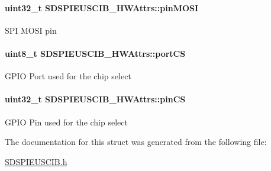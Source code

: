 \paragraph[{pin\+M\+O\+S\+I}]{\setlength{\rightskip}{0pt plus 5cm}uint32\+\_\+t S\+D\+S\+P\+I\+E\+U\+S\+C\+I\+B\+\_\+\+H\+W\+Attrs\+::pin\+M\+O\+S\+I}\label{struct_s_d_s_p_i_e_u_s_c_i_b___h_w_attrs_a76e4ea3cba4e266ff0699f85d7bd042a}
S\+P\+I M\+O\+S\+I pin 
\paragraph[{port\+C\+S}]{\setlength{\rightskip}{0pt plus 5cm}uint8\+\_\+t S\+D\+S\+P\+I\+E\+U\+S\+C\+I\+B\+\_\+\+H\+W\+Attrs\+::port\+C\+S}\label{struct_s_d_s_p_i_e_u_s_c_i_b___h_w_attrs_ac7a742be07f6c2d4cd75f3c1e0cb62db}
G\+P\+I\+O Port used for the chip select 
\paragraph[{pin\+C\+S}]{\setlength{\rightskip}{0pt plus 5cm}uint32\+\_\+t S\+D\+S\+P\+I\+E\+U\+S\+C\+I\+B\+\_\+\+H\+W\+Attrs\+::pin\+C\+S}\label{struct_s_d_s_p_i_e_u_s_c_i_b___h_w_attrs_acbca6e53d49d2367d170d54add9ababd}
G\+P\+I\+O Pin used for the chip select 

The documentation for this struct was generated from the following file\+:\begin{DoxyCompactItemize}
\item 
\hyperlink{_s_d_s_p_i_e_u_s_c_i_b_8h}{S\+D\+S\+P\+I\+E\+U\+S\+C\+I\+B.\+h}\end{DoxyCompactItemize}

